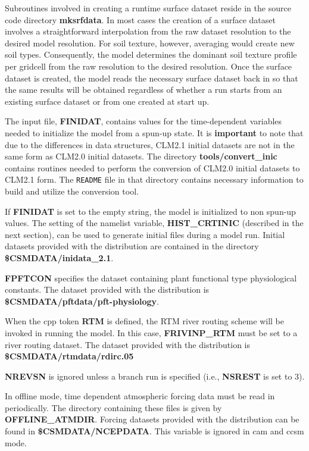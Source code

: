 Subroutines involved in creating a runtime surface dataset reside in the
source code directory {\bf mksrfdata}. In most cases the creation of a
surface dataset involves a straightforward interpolation from the raw
dataset resolution to the desired model resolution. For soil texture,
however, averaging would create new soil types. Consequently, the
model determines the dominant soil texture profile per gridcell from
the raw resolution to the desired resolution. Once the surface dataset
is created, the model reads the necessary surface dataset back in so that
the same results will be obtained regardless of whether a run starts
from an existing surface dataset or from one created at start up.

The input file, {\bf FINIDAT}, contains values for the time-dependent
variables needed to initialize the model from a spun-up state. It is
{\bf important} to note that due to the differences in data
structures, CLM2.1 initial datasets are not in the same form as CLM2.0
initial datasets. The directory {\bf tools/convert\_inic} contains
routines needed to perform the conversion of CLM2.0 initial datasets
to CLM2.1 form. The {\tt README} file in that directory contains
necessary information to build and utilize the conversion tool.

If {\bf FINIDAT} is set to the empty string, the model is initialized
to non spun-up values. The setting of the namelist variable, {\bf
HIST\_CRTINIC} (described in the next section), can be used to
generate initial files during a model run.  Initial datasets provided
with the distribution are contained in the directory
{\bf \$CSMDATA/inidata\_2.1}.

{\bf FPFTCON} specifies the dataset containing plant functional type
physiological constants. The dataset provided with the distribution is
{\bf \$CSMDATA/pftdata/pft-physiology}.

When the cpp token {\bf RTM} is defined, the RTM river routing scheme
will be invoked in running the model. In this case, {\bf FRIVINP\_RTM}
must be set to a river routing dataset. The dataset provided with the
distribution is {\bf \$CSMDATA/rtmdata/rdirc.05}

{\bf NREVSN} is ignored unless a branch run is specified (i.e., {\bf
NSREST} is set to 3).

In offline mode, time dependent atmospheric forcing data must be read
in periodically. The directory containing these files is given by {\bf
OFFLINE\_ATMDIR}. Forcing datasets provided with the distribution can
be found in {\bf \$CSMDATA/NCEPDATA}. This variable is ignored
in cam and ccsm mode.

